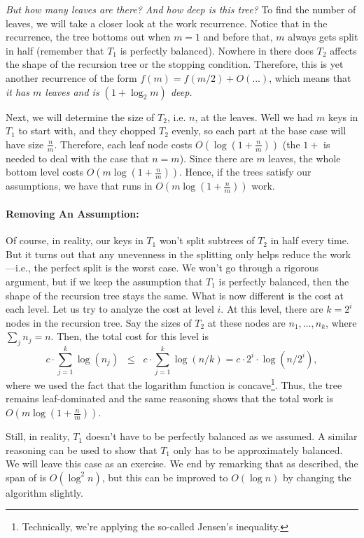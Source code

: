 \emph{But how many leaves are there? And how deep is this tree?}  To
find the number of leaves, we will take a closer look at the work
recurrence.  Notice that in the recurrence, the tree bottoms out when
$m = 1$ and before that, $m$ always gets split in half (remember
that $T_1$ is perfectly balanced).  Nowhere in there does $T_2$
affects the shape of the recursion tree or the stopping condition.
Therefore, this is yet another recurrence of the form $f(m) = f(m/2) +
O(...)$, which means that \emph{it has $m$ leaves and is $(1 + \log_2
  m)$ deep.}

Next, we will determine the size of $T_2$, i.e. $n$, at the leaves.
Well we had $m$ keys in $T_1$ to start with, and they chopped $T_2$
evenly, so each part at the base case will have size $\frac{n}{m}$.
Therefore, each leaf node costs $O(\log (1+\frac{n}{m}))$ (the $1+$ is
needed to deal with the case that $n = m$).  Since there are $m$
leaves, the whole bottom level costs $O(m \log (1+ \frac{n}{m}))$.
Hence, if the trees satisfy our assumptions, we have that \cunion{}
runs in $ O( m\log(1 + \frac{n}{m}))$ work.

\paragraph{Removing An Assumption:} Of course, in reality, our keys in $T_1$
won't split subtrees of $T_2$ in half every time.  But it turns out
that any unevenness in the splitting only helps reduce the
work---i.e., the perfect split is the worst case.  We won't go through
a rigorous argument, but if we keep the assumption that $T_1$ is
perfectly balanced, then the shape of the recursion tree stays the
same.  What is now different is the cost at each level.  Let us try to
analyze the cost at level $i$.  At this level, there are $k = 2^i$
nodes in the recursion tree. Say the sizes of $T_2$ at these nodes are
$n_1, \dots, n_k$, where $\sum_j n_j = n$. Then, the total cost for
this level is
\[
c \cdot \sum_{j=1}^k \log (n_j) \;\;\leq\;\; c \cdot \sum_{j=1}^k \log (n/k) =
c\cdot 2^i \cdot \log (n/2^i),
\]
where we used the fact that the logarithm function is
concave\footnote{Technically, we're applying the so-called Jensen's
  inequality.}.  Thus, the tree remains leaf-dominated and the same
reasoning shows that the total work is $O(m \log (1 + \frac{n}{m}))$.

Still, in reality, $T_1$ doesn't have to be perfectly balanced as we
assumed. A similar reasoning can be used to show that $T_1$ only has
to be approximately balanced. We will leave this case as an exercise.
We end by remarking that as described, the span of \cunion{} is
$O(\log^2 n)$, but this can be improved to $O(\log n)$ by changing the
algorithm slightly.

